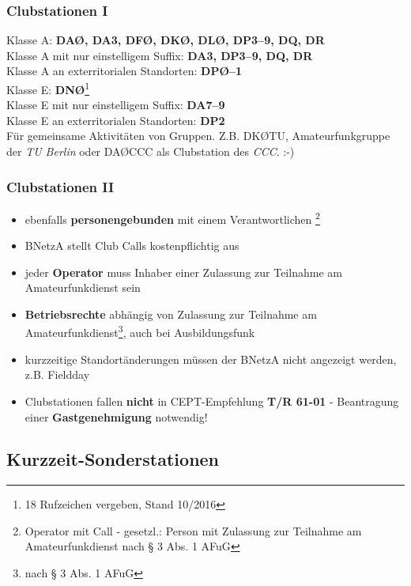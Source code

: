 \begin{frame}
  \frametitle{Clubstationen I}

  Klasse A: \textbf{DAØ, DA3, DFØ, DKØ, DLØ, DP3--9, DQ, DR} \\
  Klasse A mit nur einstelligem Suffix: \textbf{DA3, DP3--9, DQ, DR} \\
  Klasse A an exterritorialen Standorten: \textbf{DPØ--1} \\[1.5em]
  Klasse E: \textbf{DNØ}\footnote{18 Rufzeichen vergeben, Stand 10/2016} \\
  Klasse E mit nur einstelligem Suffix: \textbf{DA7--9}\\
  Klasse E an exterritorialen Standorten: \textbf{DP2} \\[2em]

  Für gemeinsame Aktivitäten von Gruppen. Z.B. DKØTU, Amateurfunkgruppe der
  \emph{TU Berlin} oder DAØCCC als Clubstation des \emph{CCC}. :-)

\end{frame}

\begin{frame}
  \frametitle{Clubstationen II}

  \begin{itemize}[<+->]
    \item ebenfalls \textbf{personengebunden} mit einem Verantwortlichen
      \footnote{Operator mit Call - gesetzl.: Person mit Zulassung zur
      Teilnahme am Amateurfunkdienst nach § 3 Abs. 1 AFuG}
    \item BNetzA stellt Club Calls kostenpflichtig aus
    \item jeder \textbf{Operator} muss Inhaber einer Zulassung zur Teilnahme am
      Amateurfunkdienst sein
    \item \textbf{Betriebsrechte} abhängig von Zulassung zur Teilnahme am
      Amateurfunkdienst\footnote{nach § 3 Abs. 1 AFuG}, auch bei Ausbildungsfunk
    \item kurzzeitige Standortänderungen müssen der BNetzA nicht angezeigt
      werden, z.B. Fieldday
    \item Clubstationen fallen \textbf{nicht} in CEPT-Empfehlung \textbf{T/R
      61-01} - Beantragung einer \textbf{Gastgenehmigung} notwendig!
  \end{itemize}

\end{frame}

\subsection{Kurzzeit-Sonderstationen}

